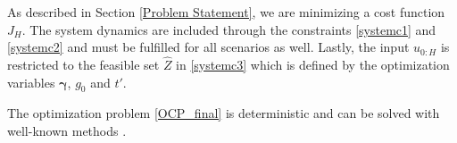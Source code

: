 As described in Section \ref{Problem Statement}, we are minimizing a cost function $J_H$. The system dynamics are included through the constraints \eqref{systemc1} and \eqref{systemc2} and must be fulfilled for all scenarios as well. Lastly, the input $u_{0:H}$ is restricted to the feasible set $\hat{Z}$ in \eqref{systemc3} which is defined by the optimization variables $\boldsymbol{\gamma}$, $g_0$ and $t'$.

The optimization problem \eqref{OCP_final} is deterministic and can be solved with well-known methods \cite{Nocedal_06}.





